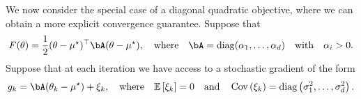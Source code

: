 We now consider the special case of a diagonal quadratic objective, where we can obtain a more explicit convergence guarantee.  Suppose that
\begin{align}\label{eq:quadratic_objective}
    F(\theta) = \frac 12 (\theta - \mustar)^\top \bA (\theta - \mustar), \quad \text{where} \quad \bA = \diag(\alpha_1, \dots, \alpha_d) \quad \text{with} \quad \alpha_i > 0 .
\end{align}
Suppose that at each iteration we have access to a stochastic gradient of the form
\begin{align}\label{eq:quadratic_stochastic_gradient}
    g_k = \bA (\theta_k - \mustar) + \xi_k, \quad \text{where} \quad \ee\left[ \xi_k \right] = 0 \quad \text{and} \quad \Cov\left( \xi_k \right) = \diag\left( \sigma_1^2, \dots, \sigma_d^2 \right).
\end{align}

